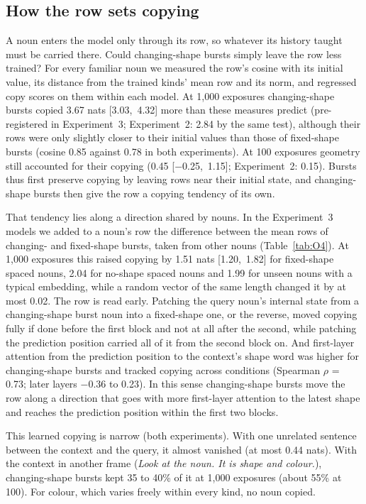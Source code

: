 \documentclass[11pt]{article}
\begin{document}
\subsection{How the row sets copying}\label{sec:rowsexp2}
A noun enters the model only through its row, so whatever its history taught must be carried there. Could changing-shape bursts simply leave the row less trained? For every familiar noun we measured the row's cosine with its initial value, its distance from the trained kinds' mean row and its norm, and regressed copy scores on them within each model. At 1,000 exposures changing-shape bursts copied 3.67 nats [3.03,~4.32] more than these measures predict (pre-registered in Experiment~3; Experiment~2: 2.84 by the same test), although their rows were only slightly closer to their initial values than those of fixed-shape bursts (cosine 0.85 against 0.78 in both experiments). At 100 exposures geometry still accounted for their copying (0.45 [$-$0.25,~1.15]; Experiment~2: 0.15). Bursts thus first preserve copying by leaving rows near their initial state, and changing-shape bursts then give the row a copying tendency of its own.

That tendency lies along a direction shared by nouns. In the Experiment~3 models we added to a noun's row the difference between the mean rows of changing- and fixed-shape bursts, taken from other nouns (Table~\ref{tab:O4}). At 1,000 exposures this raised copying by 1.51 nats [1.20,~1.82] for fixed-shape spaced nouns, 2.04 for no-shape spaced nouns and 1.99 for unseen nouns with a typical embedding, while a random vector of the same length changed it by at most 0.02. The row is read early. Patching the query noun's internal state from a changing-shape burst noun into a fixed-shape one, or the reverse, moved copying fully if done before the first block and not at all after the second, while patching the prediction position carried all of it from the second block on. And first-layer attention from the prediction position to the context's shape word was higher for changing-shape bursts and tracked copying across conditions (Spearman $\rho$ = 0.73; later layers $-$0.36 to 0.23). In this sense changing-shape bursts move the row along a direction that goes with more first-layer attention to the latest shape and reaches the prediction position within the first two blocks.

This learned copying is narrow (both experiments). With one unrelated sentence between the context and the query, it almost vanished (at most 0.44 nats). With the context in another frame (\emph{Look at the \textit{noun}. It is \textit{shape} and \textit{colour}.}), changing-shape bursts kept 35 to 40\% of it at 1,000 exposures (about 55\% at 100). For colour, which varies freely within every kind, no noun copied.
\end{document}
